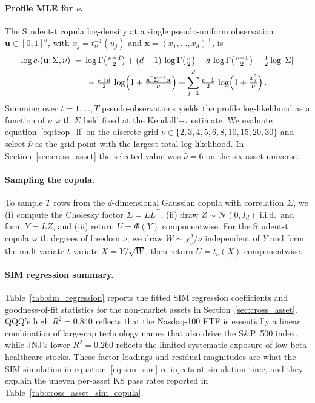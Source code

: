 \paragraph{Profile MLE for $\nu$.}
The Student-t copula log-density at a single pseudo-uniform observation $\mathbf{u} \in [0,1]^d$, with $x_j = t_\nu^{-1}(u_j)$ and $\mathbf{x} = (x_1, \dots, x_d)^\top$, is
\begin{align}
    \log c_t(\mathbf{u}; \Sigma, \nu)
    \;=\;&
    \log \Gamma\!\left(\tfrac{\nu+d}{2}\right)
    + (d-1)\,\log \Gamma\!\left(\tfrac{\nu}{2}\right)
    - d\,\log \Gamma\!\left(\tfrac{\nu+1}{2}\right)
    - \tfrac{1}{2} \log |\Sigma|
    \notag \\
    &\;
    - \tfrac{\nu+d}{2}\,\log\!\left(1 + \tfrac{\mathbf{x}^{\!\top} \Sigma^{-1} \mathbf{x}}{\nu}\right)
    + \sum_{j=1}^{d} \tfrac{\nu+1}{2}\,\log\!\left(1 + \tfrac{x_j^2}{\nu}\right).
    \label{eq:tcop_ll}
\end{align}
Summing over $t = 1, \dots, T$ pseudo-observations yields the profile log-likelihood as a function of $\nu$ with $\Sigma$ held fixed at the Kendall's-$\tau$ estimate.
We evaluate equation~\eqref{eq:tcop_ll} on the discrete grid $\nu \in \{2, 3, 4, 5, 6, 8, 10, 15, 20, 30\}$ and select $\hat{\nu}$ as the grid point with the largest total log-likelihood.
In Section~\ref{sec:cross_asset} the selected value was $\hat{\nu} = 6$ on the six-asset universe.

\paragraph{Sampling the copula.}
To sample $T$ rows from the $d$-dimensional Gaussian copula with correlation $\Sigma$, we (i) compute the Cholesky factor $\Sigma = L L^\top$, (ii) draw $Z \sim \mathcal{N}(0, I_d)$ i.i.d.\ and form $Y = L Z$, and (iii) return $U = \Phi(Y)$ componentwise.
For the Student-t copula with degrees of freedom $\nu$, we draw $W \sim \chi^2_\nu / \nu$ independent of $Y$ and form the multivariate-$t$ variate $X = Y / \sqrt{W}$, then return $U = t_\nu(X)$ componentwise.

\paragraph{SIM regression summary.}
Table~\ref{tab:sim_regression} reports the fitted SIM regression coefficients and goodness-of-fit statistics for the non-market assets in Section~\ref{sec:cross_asset}.
QQQ's high $R^2 = 0.840$ reflects that the Nasdaq-100 ETF is essentially a linear combination of large-cap technology names that also drive the S\&P~500 index, while JNJ's lower $R^2 = 0.260$ reflects the limited systematic exposure of low-beta healthcare stocks.
These factor loadings and residual magnitudes are what the SIM simulation in equation~\eqref{eq:sim_sim} re-injects at simulation time, and they explain the uneven per-asset KS pass rates reported in Table~\ref{tab:cross_asset_sim_copula}.

